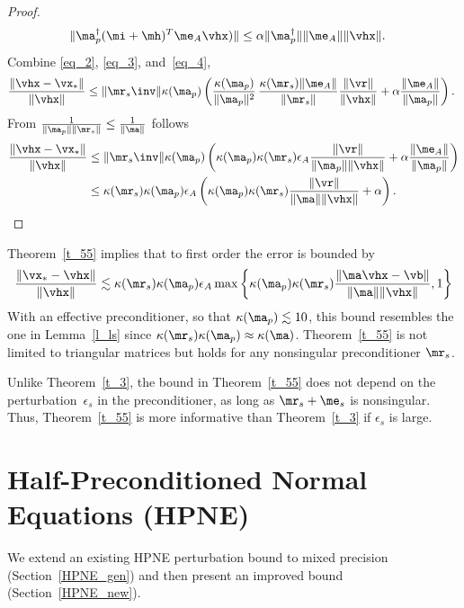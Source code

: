 \documentclass[final]{siamart220329}%
\begin{document}
\begin{proof}
\begin{align}
   \| \ma_p^\dagger(\mi+\mh)^T\me_A\vhx)\|
   & \leq \alpha\|\ma_p^\dagger\|\|\me_A\|\|\vhx\|. \label{eq_4}
\end{align} 
Combine \eqref{eq_2}, \eqref{eq_3}, and~\eqref{eq_4},
\begin{align*}
    \frac{\|\vhx-\vx_*\|}{\|\vhx\|}\leq \|\mr_s\inv\|\kappa(\ma_p)\left(\frac{\kappa(\ma_p)}{\|\ma_p\|^2}\,\frac{\kappa(\mr_s)\|\me_A\|}{\|\mr_s\|}\frac{\|\vr\|}{\|\vhx\|}+\alpha\frac{\|\me_A\|}{\|\ma_p\|}\right).\
\end{align*}
From $\frac{1}{\|\ma_p\|\|\mr_s\|}\leq\frac{1}{\|\ma\|}$ follows
\begin{align*}
    \frac{\|\vhx-\vx_*\|}{\|\vhx\|}&\leq \|\mr_s\inv\|\kappa(\ma_p)\left(\kappa(\ma_p)\kappa(\mr_s)\epsilon_A\frac{\|\vr\|}{\|\ma_p\|\|\vhx\|}+\alpha\frac{\|\me_A\|}{\|\ma_p\|}\right)\\
&\leq\kappa(\mr_s)\kappa(\ma_p)\epsilon_A\left(\kappa(\ma_p)\kappa(\mr_s)\frac{\|\vr\|}{\|\ma\|\|\vhx\|}+\alpha\right).
\end{align*}
\end{proof}

 Theorem~\ref{t_55} implies that to first order the error is bounded by \begin{align}\label{e_pnefo}
     \frac{\|\vx_*-\vhx\|}{\|\vhx\|}\lesssim
\kappa(\mr_s)\kappa(\ma_p)\epsilon_A\max\left\{\kappa(\ma_p)\kappa(\mr_s)\frac{\|\ma\vhx-\vb\|}{\|\ma\|\|\vhx\|},1\right\}
 \end{align}
With an effective preconditioner, so that $\kappa(\ma_p)\lesssim10$, this bound resembles the one in Lemma~\ref{l_ls} since  $\kappa(\mr_s)\kappa(\ma_p)\approx\kappa(\ma)$. Theorem~\ref{t_55} 
is not limited to triangular matrices but 
holds for any nonsingular preconditioner $\mr_s$.


Unlike Theorem~\ref{t_3}, the bound in Theorem~\ref{t_55} does not depend on the perturbation~$\epsilon_s$ in the preconditioner,
as long as $\mr_s+\me_s$ is nonsingular. Thus, Theorem~\ref{t_55} is more informative than Theorem~\ref{t_3}
if $\epsilon_s$ is large.


\section{Half-Preconditioned Normal Equations (HPNE)} \label{s_HPNE}
We extend an existing HPNE perturbation bound to mixed precision (Section~\ref{HPNE_gen}) and then present an improved bound (Section~\ref{HPNE_new}).
\end{document}
